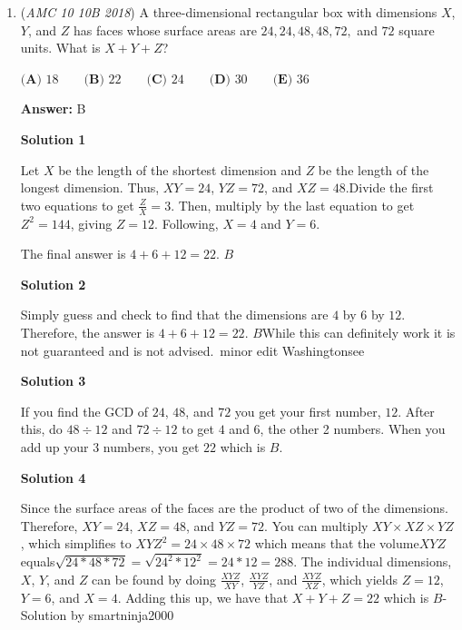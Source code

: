 \begin{enumerate}
\textbf{Solution 4}

The are $\binom{3}{2}$ ways to choose which two numbers will not be multiplied by $1$ (This step is useful since multiplying by $1$ won't a change the final outcome). Thus, the answer is $\binom{3}{2}=\boxed{\textbf{(B) }3}$



	\item (\textit{AMC 10 10B 2018}) A three-dimensional rectangular box with dimensions $X$, $Y$, and $Z$ has faces whose surface areas are $24, 24, 48, 48, 72,$ and $72$ square units. What is $X+Y+Z$?


 $\textbf{(A) }18 \qquad \textbf{(B) }22 \qquad \textbf{(C) }24 \qquad \textbf{(D) }30 \qquad \textbf{(E) }36 \qquad$

 \textbf{Answer: }B



\textbf{Solution 1}

Let $X$ be the length of the shortest dimension and $Z$ be the length of the longest dimension. Thus, $XY = 24$, $YZ = 72$, and $XZ = 48$.Divide the first two equations to get $\frac{Z}{X} = 3$. Then, multiply by the last equation to get $Z^2 = 144$, giving $Z = 12$. Following, $X = 4$ and $Y = 6$.

 The final answer is $4 + 6 + 12 = 22$. $\boxed{B}$




\textbf{Solution 2}

Simply guess and check to find that the dimensions are $4$ by $6$ by $12$. Therefore, the answer is $4 + 6 + 12 = 22$. $\boxed{B}$While this can definitely work it is not guaranteed and is not advised.~minor edit Washingtonsee

 



\textbf{Solution 3}

If you find the GCD of $24$, $48$, and $72$ you get your first number, $12$. After this, do $48 \div 12$ and $72 \div 12$ to get $4$ and $6$, the other 2 numbers. When you add up your $3$ numbers, you get $22$ which is $\boxed{B}$.

 



\textbf{Solution 4}

Since the surface areas of the faces are the product of two of the dimensions. Therefore, $XY=24$, $XZ=48$, and $YZ=72$. You can multiply $XY \times XZ \times YZ$, which simplifies to ${XYZ}^2=24 \times 48 \times 72$ which means that the volume$XYZ$ equals$\sqrt{24*48*72}=\sqrt{24^2*12^2}=24*12=288$. The individual dimensions, $X$, $Y$, and $Z$ can be found by doing $\frac{XYZ}{XY}$, $\frac{XYZ}{YZ}$, and $\frac{XYZ}{XZ}$, which yields $Z=12$, $Y=6$, and $X=4$. Adding this up, we have that $X+Y+Z=22$ which is $\boxed{B}$- Solution by smartninja2000


\end{enumerate}

